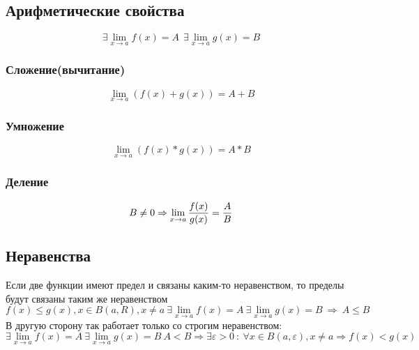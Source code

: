 \subsection{Арифметические свойства}

$$
\exists \lim_{x\to a}{f(x)} = A \ \ \exists \lim_{x\to a}{g(x)} = B
$$
\subsubsection{Сложение(вычитание)}
$$
\lim_{x\to a}{(f(x) + g(x))} = A + B
$$
\subsubsection{Умножение}
$$
\lim_{x\to a}{(f(x) * g(x))} = A * B
$$
\subsubsection{Деление}
$$
B \ne0 \Rightarrow \lim_{x\to a}{f(x)\over g(x)} = {A\over B}
$$


\subsection{Неравенства}
Если две функции имеют предел и связаны каким-то неравенством, то пределы будут связаны таким же неравенством
$$
f(x) \leq g(x), x\in B(a, R), x\ne a \ \exists \lim_{x\to a}{f(x)} = A \ \exists\lim_{x\to a}{g(x)} = B \ \Rightarrow \ A\leq B
$$
В другую сторону так работает только со строгим неравенством:
$$
\exists \lim_{x\to a}{f(x)} = A \ \exists\lim_{x\to a}{g(x)} = B \ A < B \Rightarrow 
\exists \varepsilon > 0 \ : \ \forall x \in B(a, \varepsilon), x\ne a \Rightarrow f(x) < g(x)
$$
